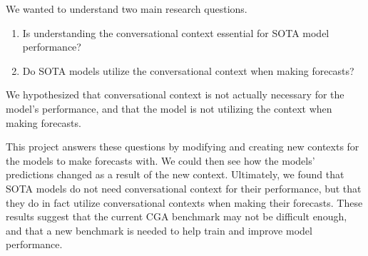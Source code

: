 We wanted to understand two main research questions.
\begin{enumerate}
    \item Is understanding the conversational context essential for SOTA model performance?
    \item Do SOTA models utilize the conversational context when making forecasts?
\end{enumerate}
We hypothesized that conversational context is not actually necessary for the model's performance, and that the model is not utilizing the context when making forecasts. 

This project answers these questions by modifying and creating new contexts for the models to make forecasts with. 
We could then see how the models' predictions changed as a result of the new context. 
Ultimately, we found that SOTA models do not need conversational context for their performance, but that they do in fact utilize conversational contexts when making their forecasts. 
These results suggest that the current CGA benchmark may not be difficult enough, and that a new benchmark is needed to help train and improve model performance. 
